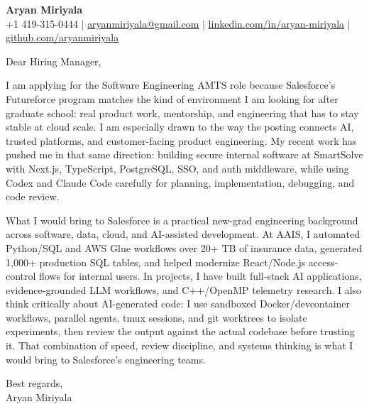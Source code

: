 \documentclass[letterpaper,11pt]{article}
\begin{document}
\begin{center}
{\Large \textbf{Aryan Miriyala}}\\
\vspace{2pt}
+1 419-315-0444 $|$ \href{mailto:aryanmiriyala@gmail.com}{aryanmiriyala@gmail.com} $|$
\href{https://www.linkedin.com/in/aryan-miriyala-7788a21b6/}{linkedin.com/in/aryan-miriyala} $|$
\href{https://github.com/aryanmiriyala}{github.com/aryanmiriyala}
\end{center}

\vspace{12pt}

Dear Hiring Manager,

I am applying for the Software Engineering AMTS role because Salesforce's Futureforce program matches the kind of environment I am looking for after graduate school: real product work, mentorship, and engineering that has to stay stable at cloud scale. I am especially drawn to the way the posting connects AI, trusted platforms, and customer-facing product engineering. My recent work has pushed me in that same direction: building secure internal software at SmartSolve with Next.js, TypeScript, PostgreSQL, SSO, and auth middleware, while using Codex and Claude Code carefully for planning, implementation, debugging, and code review.

What I would bring to Salesforce is a practical new-grad engineering background across software, data, cloud, and AI-assisted development. At AAIS, I automated Python/SQL and AWS Glue workflows over 20+ TB of insurance data, generated 1,000+ production SQL tables, and helped modernize React/Node.js access-control flows for internal users. In projects, I have built full-stack AI applications, evidence-grounded LLM workflows, and C++/OpenMP telemetry research. I also think critically about AI-generated code: I use sandboxed Docker/devcontainer workflows, parallel agents, tmux sessions, and git worktrees to isolate experiments, then review the output against the actual codebase before trusting it. That combination of speed, review discipline, and systems thinking is what I would bring to Salesforce's engineering teams.

Best regards,\\
Aryan Miriyala
\end{document}
